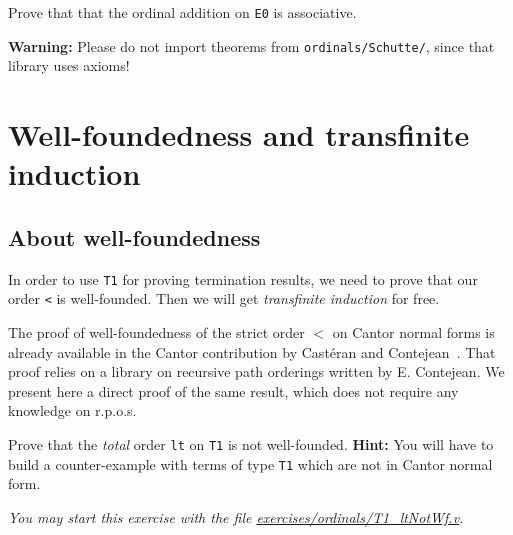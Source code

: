 \begin{exercise}
  Prove that that the ordinal addition on \texttt{E0} is associative.

  \textbf{Warning:}  Please do not import theorems from
  \texttt{ordinals/Schutte/}, since that library uses axioms!
\end{exercise}




\section{Well-foundedness and transfinite induction}


\subsection{About  well-foundedness}
\label{sec:orgheadline82}
   In order to use \texttt{T1} for proving termination results,
we need to prove that  our order \texttt{<} is well-founded. Then we will get \emph{transfinite induction} for free.


The proof of well-foundedness of the strict order $<$ on Cantor normal forms is already 
available in the Cantor contribution by Castéran and Contejean~\cite{CantorContrib}. That proof relies on a library on recursive path orderings written by
E. Contejean. We present here  a direct proof of the same result, which does not require any knowledge on r.p.o.s.


\begin{exercise}
Prove that the \emph{total} order \texttt{lt} on \texttt{T1} is not well-founded. 
\textbf{Hint:}  You will have to build a counter-example with terms of type \texttt{T1}
which are not in Cantor normal form.

\emph{You may start this exercise with the file
    \href{https://github.com/coq-community/hydra-battles/tree/master/exercises/ordinals/T1_ltNotWf.v}{exercises/ordinals/T1\_ltNotWf.v}.}
\end{exercise}


